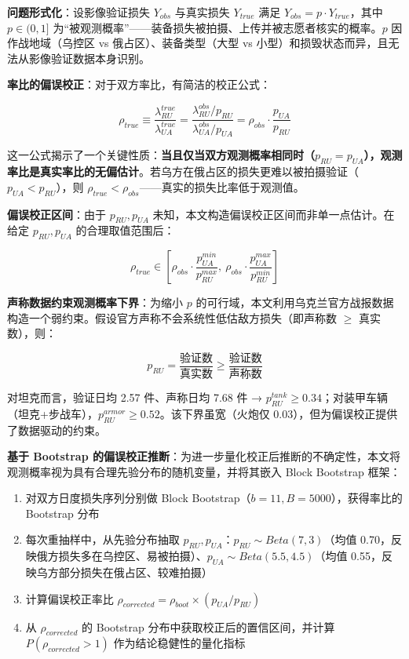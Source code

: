 \documentclass[
  a4paper,
  fontset=none,
]{ctexart}
\providecommand{\tightlist}{%
  \setlength{\itemsep}{0pt}\setlength{\parskip}{0pt}}
\begin{document}
\textbf{问题形式化}：设影像验证损失 \(Y_{obs}\) 与真实损失
\(Y_{true}\) 满足 \(Y_{obs} = p \cdot Y_{true}\)，其中 \(p \in (0,1]\)
为``被观测概率''------装备损失被拍摄、上传并被志愿者核实的概率。\(p\)
因作战地域（乌控区 vs 俄占区）、装备类型（大型 vs
小型）和损毁状态而异，且无法从影像验证数据本身识别。

\textbf{率比的偏误校正}：对于双方率比，有简洁的校正公式：

\[
\rho_{true} \equiv \frac{\lambda_{RU}^{true}}{\lambda_{UA}^{true}} = \frac{\lambda_{RU}^{obs} / p_{RU}}{\lambda_{UA}^{obs} / p_{UA}} = \rho_{obs} \cdot \frac{p_{UA}}{p_{RU}}
\]

这一公式揭示了一个关键性质：\textbf{当且仅当双方观测概率相同时（\(p_{RU} = p_{UA}\)），观测率比是真实率比的无偏估计}。若乌方在俄占区的损失更难以被拍摄验证（\(p_{UA} < p_{RU}\)），则
\(\rho_{true} < \rho_{obs}\)------真实的损失比率低于观测值。

\textbf{偏误校正区间}：由于 \(p_{RU}, p_{UA}\)
未知，本文构造偏误校正区间而非单一点估计。在给定 \(p_{RU}, p_{UA}\)
的合理取值范围后：

\[
\rho_{true} \in \left[\rho_{obs} \cdot \frac{p_{UA}^{min}}{p_{RU}^{max}},\ \rho_{obs} \cdot \frac{p_{UA}^{max}}{p_{RU}^{min}}\right]
\]

\textbf{声称数据约束观测概率下界}：为缩小 \(p\)
的可行域，本文利用乌克兰官方战报数据构造一个弱约束。假设官方声称不会系统性低估敌方损失（即声称数
\(\geq\) 真实数），则：

\[
p_{RU} = \frac{\text{验证数}}{\text{真实数}} \geq \frac{\text{验证数}}{\text{声称数}}
\]

对坦克而言，验证日均 2.57 件、声称日均 7.68 件 →
\(p_{RU}^{tank} \geq 0.34\)；对装甲车辆（坦克+步战车），\(p_{RU}^{armor} \geq 0.52\)。该下界虽宽（火炮仅
0.03），但为偏误校正提供了数据驱动的约束。

\textbf{基于 Bootstrap
的偏误校正推断}：为进一步量化校正后推断的不确定性，本文将观测概率视为具有合理先验分布的随机变量，并将其嵌入
Block Bootstrap 框架：

\begin{enumerate}
\def\labelenumi{\arabic{enumi}.}
\tightlist
\item
  对双方日度损失序列分别做 Block
  Bootstrap（\(b=11, B=5000\)），获得率比的 Bootstrap 分布
\item
  每次重抽样中，从先验分布抽取
  \(p_{RU}, p_{UA}\)：\(p_{RU} \sim Beta(7, 3)\)（均值
  0.70，反映俄方损失多在乌控区、易被拍摄）、\(p_{UA} \sim Beta(5.5, 4.5)\)（均值
  0.55，反映乌方部分损失在俄占区、较难拍摄）
\item
  计算偏误校正率比
  \(\rho_{corrected} = \rho_{boot} \times (p_{UA} / p_{RU})\)
\item
  从 \(\rho_{corrected}\) 的 Bootstrap
  分布中获取校正后的置信区间，并计算 \(P(\rho_{corrected} > 1)\)
  作为结论稳健性的量化指标
\end{enumerate}
\end{document}
